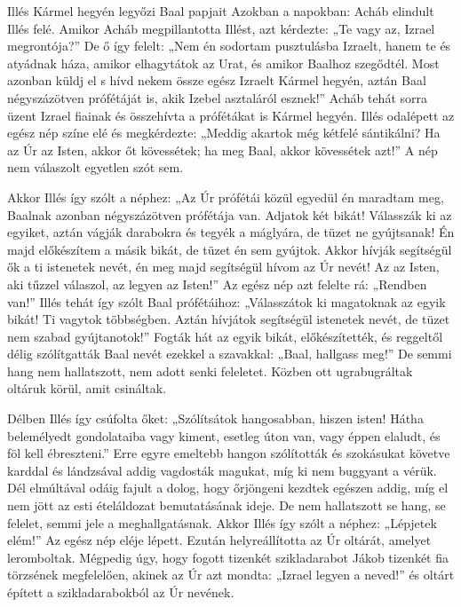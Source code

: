 \documentclass[twoside]{article}
\begin{document}
\begin{lectio}{Illés Kármel hegyén legyőzi Baal papjait}
\noindent Azokban a napokban: Acháb elindult Illés felé. Amikor Acháb megpillantotta Illést, azt kérdezte: „Te vagy az, Izrael megrontója?” De ő így felelt: „Nem én sodortam pusztulásba Izraelt, hanem te és atyádnak háza, amikor elhagytátok az Urat, és amikor Baalhoz szegődtél. Most azonban küldj el s hívd nekem össze egész Izraelt Kármel hegyén, aztán Baal négyszázötven prófétáját is, akik Izebel asztaláról esznek!” Acháb tehát sorra üzent Izrael fiainak és összehívta a prófétákat is Kármel hegyén. Illés odalépett az egész nép színe elé és megkérdezte: „Meddig akartok még kétfelé sántikálni? Ha az Úr az Isten, akkor őt kövessétek; ha meg Baal, akkor kövessétek azt!” A nép nem válaszolt egyetlen szót sem.

Akkor Illés így szólt a néphez: „Az Úr prófétái közül egyedül én maradtam meg, Baalnak azonban négyszázötven prófétája van. Adjatok két bikát! Válasszák ki az egyiket, aztán vágják darabokra és tegyék a máglyára, de tüzet ne gyújtsanak! Én majd előkészítem a másik bikát, de tüzet én sem gyújtok. Akkor hívják segítségül ők a ti istenetek nevét, én meg majd segítségül hívom az Úr nevét! Az az Isten, aki tűzzel válaszol, az legyen az Isten!” Az egész nép azt felelte rá: „Rendben van!” Illés tehát így szólt Baal prófétáihoz: „Válasszátok ki magatoknak az egyik bikát! Ti vagytok többségben. Aztán hívjátok segítségül istenetek nevét, de tüzet nem szabad gyújtanotok!” Fogták hát az egyik bikát, előkészítették, és reggeltől délig szólítgatták Baal nevét ezekkel a szavakkal: „Baal, hallgass meg!” De semmi hang nem hallatszott, nem adott senki feleletet. Közben ott ugrabugráltak oltáruk körül, amit csináltak.

Délben Illés így csúfolta őket: „Szólítsátok hangosabban, hiszen isten! Hátha belemélyedt gondolataiba vagy kiment, esetleg úton van, vagy éppen elaludt, és föl kell ébreszteni.” Erre egyre emeltebb hangon szólították és szokásukat követve karddal és lándzsával addig vagdosták magukat, míg ki nem buggyant a vérük. Dél elmúltával odáig fajult a dolog, hogy őrjöngeni kezdtek egészen addig, míg el nem jött az esti ételáldozat bemutatásának ideje. De nem hallatszott se hang, se felelet, semmi jele a meghallgatásnak. Akkor Illés így szólt a néphez: „Lépjetek elém!” Az egész nép eléje lépett. Ezután helyreállította az Úr oltárát, amelyet leromboltak. Mégpedig úgy, hogy fogott tizenkét szikladarabot Jákob tizenkét fia törzsének megfelelően, akinek az Úr azt mondta: „Izrael legyen a neved!” és oltárt épített a szikladarabokból az Úr nevének.


\end{lectio}
\end{document}
